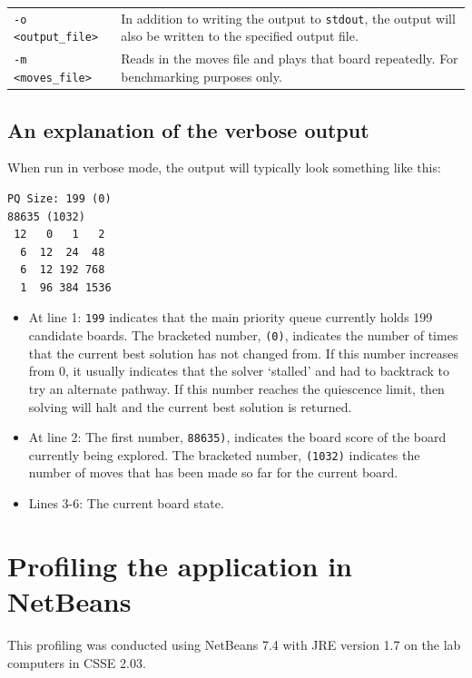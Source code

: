 \documentclass[a4paper, 11pt, titlepage]{report}
\begin{document}
\begin{appendices}
\begin{table}[H]
\begin{tabularx}{\textwidth}{lX}
    \texttt{-o <output\_file>} & In addition to writing the output to \texttt{stdout}, the output will also be written to the specified output file. \\
    \texttt{-m <moves\_file>} & Reads in the moves file and plays that board repeatedly. For benchmarking purposes only. \\
    \hline
    \end{tabularx}%
  \label{tab:method2-parameters}%
\end{table}%

\section{An explanation of the verbose output}
When run in verbose mode, the output will typically look something like this:
\begin{lstlisting}
PQ Size: 199 (0)
88635 (1032)
 12   0   1   2
  6  12  24  48
  6  12 192 768
  1  96 384 1536
\end{lstlisting}

\begin{itemize}
\item At line 1: \texttt{199} indicates that the main priority queue currently holds 199 candidate boards. The bracketed number, \texttt{(0)}, indicates the number of times that the current best solution has not changed from. If this number increases from 0, it usually indicates that the solver `stalled' and had to backtrack to try an alternate pathway. If this number reaches the quiescence limit, then solving will halt and the current best solution is returned.
\item At line 2: The first number, \texttt{88635)}, indicates the board score of the board currently being explored. The bracketed number, \texttt{(1032)} indicates the number of moves that has been made so far for the current board. 
\item Lines 3-6: The current board state.
\end{itemize}

\chapter{Profiling the application in NetBeans}\label{appendix-profiling}
This profiling was conducted using NetBeans 7.4 with JRE version 1.7 on the lab computers in CSSE 2.03.


\end{appendices}
\end{document}
